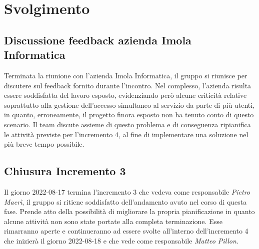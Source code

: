 \section{Svolgimento}
\subsection{Discussione feedback azienda Imola Informatica }
Terminata la riunione con l'azienda Imola Informatica, il gruppo si riunisce per discutere sul feedback fornito durante l'incontro. 
Nel complesso, l'azienda risulta essere soddisfatta del lavoro esposto, evidenziando però alcune criticità relative soprattutto alla gestione dell'accesso simultaneo al servizio da parte di più utenti, in quanto, erroneamente, il progetto finora esposto non ha tenuto conto di questo scenario. \newline
Il team discute assieme di questo problema e di conseguenza ripianifica le attività previste per l'incremento 4, al fine di implementare una soluzione nel più breve tempo possibile. 

\subsection{Chiusura Incremento 3}
Il giorno 2022-08-17 termina l'incremento 3 che vedeva come responsabile 
\textit{Pietro Macrì}, il gruppo si ritiene soddisfatto dell'andamento avuto nel corso di questa fase. Prende atto della possibilità di migliorare la propria pianificazione in quanto alcune attività non sono state portate alla completa terminazione. Esse rimarranno aperte e continueranno ad essere svolte all'interno dell'incremento 4 che inizierà il giorno 2022-08-18 e che vede come responsabile \textit{Matteo Pillon}. 

